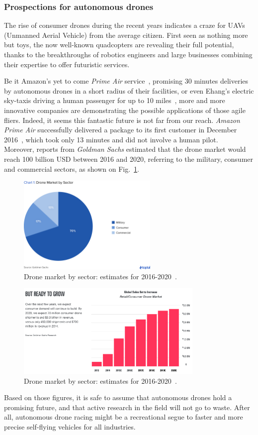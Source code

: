 \subsubsection{Prospections for autonomous drones}
The rise of consumer drones during the recent years indicates a craze for UAVs
(Unmanned Aerial Vehicle) from the average citizen. First seen as nothing more
but toys, the now well-known quadcopters are revealing their full potential,
thanks to the breakthroughs of robotics engineers and large businesses combining
their expertise to offer futuristic services.

Be it Amazon's yet to come \emph{Prime Air} service~\cite{PrimeAir}, promising
30 minutes deliveries by autonomous drones in a short radius of their
facilities, or even Ehang's electric sky-taxis driving a human passenger for up
to 10 miles~\cite{Ehang184}, more and more innovative companies are
demonstrating the possible applications of those agile fliers.  Indeed, it seems
this fantastic future is not far from our reach. \emph{Amazon Prime Air}
successfully delivered a package to its first customer in December
2016~\cite{PrimeAirFirst}, which took only 13 minutes and did not involve a
human pilot.\\

Moreover, reports from \emph{Goldman Sachs} \cite{TopTal} estimated that the
drone market would reach 100 billion USD between 2016 and 2020, referring to
the military, consumer and commercial sectors, as shown on
Fig.~\ref{fig:toptal}.\\

\begin{figure}[h]
	\centering
	\includegraphics[width=0.6\textwidth]{figure/toptal.png}
	\caption{Drone market by sector: estimates for 2016-2020~\cite{TopTal}.}
	\label{fig:toptal}
\end{figure}

\begin{figure}[h]
	\centering
	\includegraphics[width=0.8\textwidth]{figure/drone_market.png}
	\caption{Drone market by sector: estimates for 2016-2020~\cite{Goldman}.}
	\label{fig:goldmansachs}
\end{figure}

Based on those figures, it is safe to assume that autonomous drones hold a
promising future, and that active research in the field will not go to waste.
After all, autonomous drone racing might be a recreational segue to faster and
more precise self-flying vehicles for all industries.

